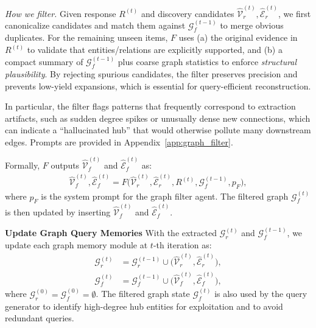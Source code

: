 \emph{How we filter.}
Given response $R^{(t)}$ and discovery candidates $\hat{\mathcal{V}}_r^{(t)},\hat{\mathcal{E}}_r^{(t)}$, we first canonicalize candidates and match them against $\mathcal{G}_f^{(t-1)}$ to merge obvious duplicates.
For the remaining unseen items, $F$ uses (a) the original evidence in $R^{(t)}$ to validate that entities/relations are explicitly supported, and (b) a compact summary of $\mathcal{G}_f^{(t-1)}$ plus coarse graph statistics to enforce \emph{structural plausibility}. By rejecting spurious candidates, the filter preserves precision and prevents low-yield expansions, which is essential for query-efficient reconstruction.

In particular, the filter flags patterns that frequently correspond to extraction artifacts, such as sudden degree spikes or unusually dense new connections, which can indicate a ``hallucinated hub'' that would otherwise pollute many downstream edges. Prompts are provided in Appendix~\ref{app:graph_filter}.

Formally, $F$ outputs $\hat{\mathcal{V}}_f^{(t)}$ and $\hat{\mathcal{E}}_f^{(t)}$ as:
\begin{align}
\hat{\mathcal{V}}_f^{(t)}, \hat{\mathcal{E}}_f^{(t)} 
= F\big(\hat{\mathcal{V}}_r^{(t)}, \hat{\mathcal{E}}_r^{(t)}, R^{(t)}, \mathcal{G}_f^{(t-1)}, p_F\big),
\end{align}
where $p_F$ is the system prompt for the graph filter agent. 
The filtered graph $\mathcal{G}_f^{(t)}$ is then updated by inserting $\hat{\mathcal{V}}_f^{(t)}$ and $\hat{\mathcal{E}}_f^{(t)}$.


\noindent\textbf{Update Graph Query Memories}
With the extracted $\mathcal{G}_r^{(t)}$ and $\mathcal{G}_f^{(t-1)}$, we update each graph memory module at $t$-th iteration as:
\begin{align}
\mathcal{G}_r^{(t)} &= \mathcal{G}_r^{(t-1)} \cup \big(\hat{\mathcal{V}}_r^{(t)}, \hat{\mathcal{E}}_r^{(t)}\big), \\
\mathcal{G}_f^{(t)}
&= \mathcal{G}_f^{(t-1)} \cup \big(\hat{\mathcal{V}}_f^{(t)}, \hat{\mathcal{E}}_f^{(t)}\big),
\end{align}
where $\mathcal{G}_r^{(0)} = \mathcal{G}_f^{(0)} = \emptyset$. The filtered graph state $\mathcal{G}_f^{(t)}$ is also used by the query generator to identify high-degree hub entities for exploitation and to avoid redundant queries.



